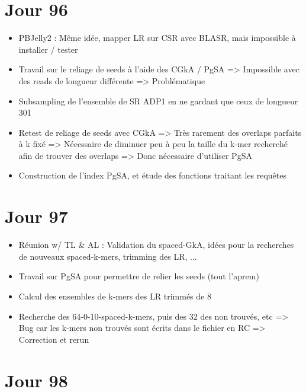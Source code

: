 \documentclass[12pt]{report}
\begin{document}
\section{Jour 96}

\begin{itemize}
	\item PBJelly2 : Même idée, mapper LR sur CSR avec BLASR, mais impossible à installer / tester
	
	\item Travail sur le reliage de seeds à l'aide des CGkA / PgSA => Impossible avec des reads de longueur différente => Problématique
	
	\item Subsampling de l'ensemble de SR ADP1 en ne gardant que ceux de longueur 301
	
	\item Retest de reliage de seeds avec CGkA => Très rarement des overlaps parfaits à k fixé
		  => Nécessaire de diminuer peu à peu la taille du k-mer recherché afin de trouver des overlaps
		  => Donc nécessaire d'utiliser PgSA
	
	\item Construction de l'index PgSA, et étude des fonctions traitant les requêtes 
\end{itemize}

\section{Jour 97}

\begin{itemize}
	\item Réunion w/ TL \& AL : Validation du spaced-GkA, idées pour la recherches de nouveaux spaced-k-mers, trimming des LR, ...
	
	\item Travail sur PgSA pour permettre de relier les seeds (tout l'aprem)
	
	\item Calcul des ensembles de k-mers des LR trimmés de 8
	
	\item Recherche des 64-0-10-spaced-k-mers, puis des 32 des non trouvés, etc => Bug car les k-mers non trouvés sont
		  écrits dans le fichier en RC => Correction et rerun
\end{itemize}

\section{Jour 98}
\end{document}
